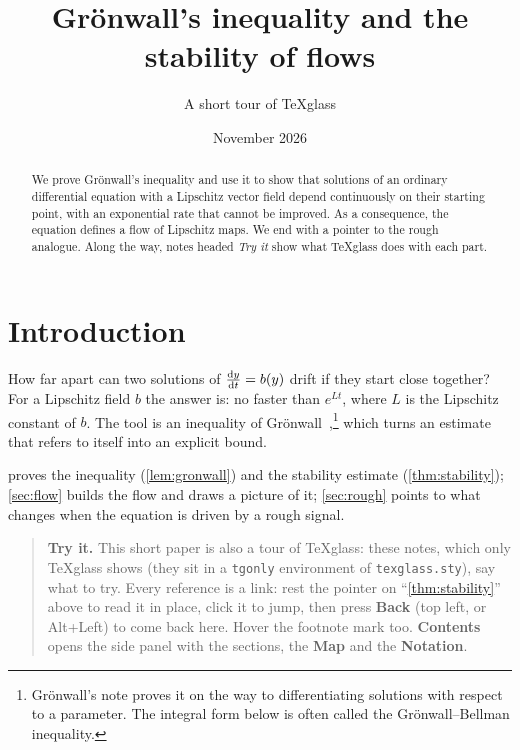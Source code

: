 \documentclass{amsart}
\title{Gr\"onwall's inequality and the stability of flows}
\author{A short tour of TeXglass}
\date{November 2026}
\theoremstyle{definition}
\theoremstyle{remark}
\numberwithin{equation}{section}
\newenvironment{tryit}{\begin{quote}\small\textbf{Try it.}}{\end{quote}}
\begin{document}
\begin{abstract}
We prove Gr\"onwall's inequality and use it to show that solutions of an
ordinary differential equation with a Lipschitz vector field depend
continuously on their starting point, with an exponential rate that cannot be
improved. As a consequence, the equation defines a flow of Lipschitz maps. We
end with a pointer to the rough analogue.\iftexglass{} Along the way, notes
headed \emph{Try it} show what TeXglass does with each part.\fi
\end{abstract}

\maketitle

\tableofcontents

\section{Introduction}\label{sec:intro}

How far apart can two solutions of $\dv{y}{t} = b(y)$ drift if they start
close together? For a Lipschitz field $b$ the answer is: no faster than
$e^{Lt}$, where $L$ is the Lipschitz constant of $b$. The tool is an
inequality of Gr\"onwall~\cite{gronwall},\footnote{Gr\"onwall's note proves
it on the way to differentiating solutions with respect to a parameter. The
integral form below is often called the Gr\"onwall--Bellman inequality.}
which turns an estimate that refers to itself into an explicit bound.

 proves the inequality (\cref{lem:gronwall}) and the
stability estimate (\cref{thm:stability}); \cref{sec:flow} builds the flow and
draws a picture of it; \cref{sec:rough} points to what changes when the
equation is driven by a rough signal.


\begin{tgonly}
\begin{tryit}
This short paper is also a tour of TeXglass: these notes, which only
TeXglass shows (they sit in a \texttt{tgonly} environment of
\texttt{texglass.sty}), say what to try. Every reference is a link: rest the
pointer on ``\cref{thm:stability}'' above to read it in place, click it to
jump, then press \textbf{Back} (top left, or Alt+Left) to come back here.
Hover the footnote mark too. \textbf{Contents} opens the side panel with the
sections, the \textbf{Map} and the \textbf{Notation}.
\end{tryit}
\end{tgonly}
\end{document}
